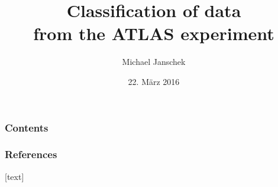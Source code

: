 \documentclass[12pt]{beamer}
\begin{document}
\title{Classiﬁcation of data\\ from the ATLAS experiment}
\author{Michael Janschek}
\date{22. M\"arz 2016}

	\begin{frame}
		\maketitle
	\end{frame}
	
	\begin{frame}
		\frametitle{Contents}
		\tableofcontents
	\end{frame}
	
	
	
	
	
	
	\begin{frame}[allowframebreaks]
		\frametitle{References}
		
				
	\end{frame}
	
\end{document}
